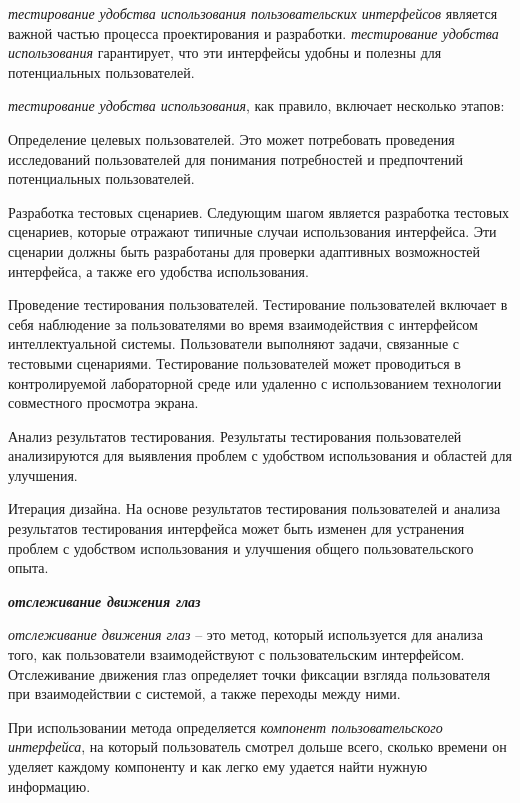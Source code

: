 {\textit{тестирование удобства использования пользовательских интерфейсов} является важной частью процесса проектирования и разработки. \textit{тестирование удобства использования} гарантирует, что эти интерфейсы удобны и полезны для потенциальных пользователей.

\textit{тестирование удобства использования}, как правило, включает несколько этапов:

\begin{textitemize}
	\item Определение целевых пользователей. Это может потребовать проведения исследований пользователей для понимания потребностей и предпочтений потенциальных пользователей.
	\item Разработка тестовых сценариев. Следующим шагом является разработка тестовых сценариев, которые отражают типичные случаи использования интерфейса. Эти сценарии должны быть разработаны для проверки адаптивных возможностей интерфейса, а также его удобства использования.
	\item Проведение тестирования пользователей. Тестирование пользователей включает в себя наблюдение за пользователями во время взаимодействия с интерфейсом интеллектуальной системы. Пользователи выполняют задачи, связанные с тестовыми сценариями. Тестирование пользователей может проводиться в контролируемой лабораторной среде или удаленно с использованием технологии совместного просмотра экрана.
	\item Анализ результатов тестирования. Результаты тестирования пользователей анализируются для выявления проблем с удобством использования и областей для улучшения.
	\item Итерация дизайна. На основе результатов тестирования пользователей и анализа результатов тестирования интерфейса может быть изменен для устранения проблем с удобством использования и улучшения общего пользовательского опыта.
\end{textitemize}


\textbf{\textit{отслеживание движения глаз}} 


\textit{отслеживание движения глаз} -- это метод, который используется для анализа того, как пользователи взаимодействуют с пользовательским интерфейсом. Отслеживание движения глаз определяет точки фиксации взгляда пользователя при взаимодействии с системой, а также переходы между ними. 

При использовании метода определяется \textit{компонент пользовательского интерфейса}, на который пользователь смотрел дольше всего, сколько времени он уделяет каждому компоненту и как легко ему удается найти нужную информацию.

}

